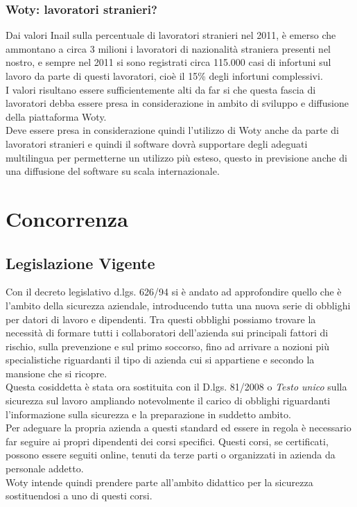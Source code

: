 \subsection{Woty: lavoratori stranieri?}
Dai valori Inail sulla percentuale di lavoratori stranieri nel 2011, è emerso che ammontano a circa 3 milioni i lavoratori di nazionalità straniera presenti nel nostro, e sempre nel 2011 si sono registrati circa 115.000 casi di infortuni sul lavoro da parte di questi lavoratori, cioè il 15\% degli infortuni complessivi.\\
I valori risultano essere sufficientemente alti da far si che questa fascia di lavoratori debba essere presa in considerazione in ambito di sviluppo e diffusione della piattaforma Woty.\\
Deve essere presa in considerazione quindi l'utilizzo di Woty anche da parte di lavoratori stranieri e quindi il software dovrà supportare degli adeguati multilingua per permetterne un utilizzo più esteso, questo in previsione anche di una diffusione del software su scala internazionale.











\chapter{Concorrenza}

\section{Legislazione Vigente}

Con il decreto legislativo d.lgs. 626/94 si è andato ad approfondire quello che è l'ambito della sicurezza aziendale, introducendo tutta una nuova serie di obblighi per datori di lavoro e dipendenti. Tra questi obblighi possiamo trovare la necessità di formare tutti i collaboratori dell'azienda sui principali fattori di rischio, sulla prevenzione e sul primo soccorso, fino ad arrivare a nozioni più specialistiche riguardanti il tipo di azienda cui si appartiene e secondo la mansione che si ricopre.\\
Questa cosiddetta  è stata ora sostituita con il D.lgs. 81/2008 o \textit{Testo unico} sulla sicurezza sul lavoro ampliando notevolmente il carico di obblighi riguardanti l'informazione sulla sicurezza e la preparazione in suddetto ambito.\\
Per adeguare la propria azienda a questi standard ed essere in regola è necessario far seguire ai propri dipendenti dei corsi specifici. Questi corsi, se certificati, possono essere seguiti online, tenuti da terze parti o organizzati in azienda da personale addetto.\\
Woty intende quindi prendere parte all'ambito didattico per la sicurezza sostituendosi a uno di questi corsi.


